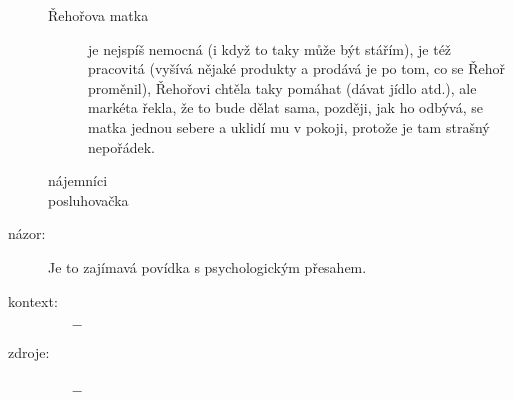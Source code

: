 \documentclass{article}
\begin{document}
\begin{description}
\begin{description}
            \item[Řehořova matka] je nejspíš nemocná (i když to taky může být stářím), je též pracovitá (vyšívá nějaké produkty a prodává je po tom, co se Řehoř proměnil), Řehořovi chtěla taky pomáhat (dávat jídlo atd.), ale markéta řekla, že to bude dělat sama, později, jak ho odbývá, se matka jednou sebere a uklidí mu v pokoji, protože je tam strašný nepořádek.
            \item[nájemníci]
            \item[posluhovačka]
        \end{description}
    \item[názor:] Je to zajímavá povídka s psychologickým přesahem. 
    \item[kontext:]  \vspace{-0.5em}
        \setlength\itemsep{0em}
        \begin{itemize}
            \item[$-$]
        \end{itemize}
    \item[zdroje:] $ $
    \begin{itemize}
        \setlength\itemsep{0em}
        \item[$-$]
    \end{itemize}
\end{description}
\end{document}
